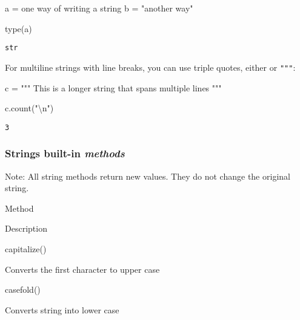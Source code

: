\documentclass[
  letterpaper,
  DIV=11,
  numbers=noendperiod]{scrreprt}
\newenvironment{Shaded}{\begin{snugshade}}{\end{snugshade}}
\newcommand{\BuiltInTok}[1]{\textcolor[rgb]{0.00,0.23,0.31}{#1}}
\newcommand{\CharTok}[1]{\textcolor[rgb]{0.13,0.47,0.30}{#1}}
\newcommand{\NormalTok}[1]{\textcolor[rgb]{0.00,0.23,0.31}{#1}}
\newcommand{\OperatorTok}[1]{\textcolor[rgb]{0.37,0.37,0.37}{#1}}
\newcommand{\StringTok}[1]{\textcolor[rgb]{0.13,0.47,0.30}{#1}}
\begin{document}
\begin{Shaded}
\begin{Highlighting}[]
\NormalTok{a }\OperatorTok{=} \StringTok{\textquotesingle{}one way of writing a string\textquotesingle{}}
\NormalTok{b }\OperatorTok{=} \StringTok{"another way"}

\BuiltInTok{type}\NormalTok{(a)}
\end{Highlighting}
\end{Shaded}

\begin{verbatim}
str
\end{verbatim}

For multiline strings with line breaks, you can use triple quotes,
either \texttt{\textquotesingle{}\textquotesingle{}\textquotesingle{}}
or \texttt{"""}:

\begin{Shaded}
\begin{Highlighting}[]
\NormalTok{c }\OperatorTok{=} \StringTok{"""}
\StringTok{This is a longer string that}
\StringTok{spans multiple lines}
\StringTok{"""}
\end{Highlighting}
\end{Shaded}

\begin{Shaded}
\begin{Highlighting}[]
\NormalTok{c.count(}\StringTok{"}\CharTok{\textbackslash{}n}\StringTok{"}\NormalTok{)}
\end{Highlighting}
\end{Shaded}

\begin{verbatim}
3
\end{verbatim}

\hypertarget{strings-built-in-methods}{%
\subsubsection{\texorpdfstring{Strings built-in
\emph{methods}}{Strings built-in methods}}\label{strings-built-in-methods}}

Note: All string methods return new values. They do not change the
original string.

Method

Description

capitalize()

Converts the first character to upper case

casefold()

Converts string into lower case
\end{document}
